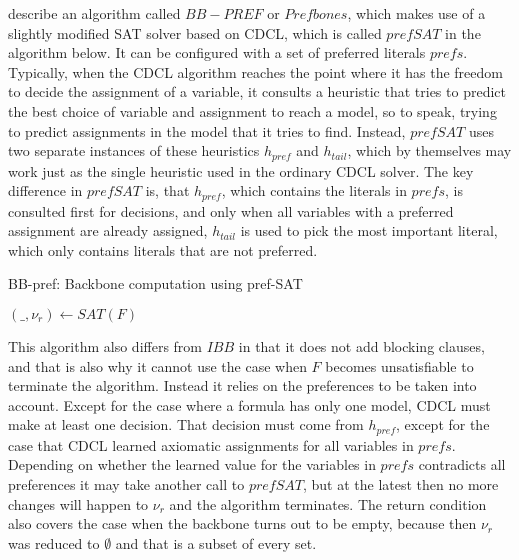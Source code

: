 \cite{PJ18} describe an algorithm called $BB-PREF$ or $Prefbones$, which makes use of a slightly modified SAT solver based on CDCL, which is called $prefSAT$ in the algorithm below. It can be configured with a set of preferred literals $prefs$. Typically, when the CDCL algorithm reaches the point where it has the freedom to decide the assignment of a variable, it consults a heuristic that tries to predict the best choice of variable and assignment to reach a model, so to speak, trying to predict assignments in the model that it tries to find. Instead, $prefSAT$ uses two separate instances of these heuristics $h_{pref}$ and $h_{tail}$, which by themselves may work just as the single heuristic used in the ordinary CDCL solver. The key difference in $prefSAT$ is, that $h_{pref}$, which contains the literals in $prefs$,  is consulted first for decisions, and only when all variables with a preferred assignment are already assigned, $h_{tail}$ is used to pick the most important literal, which only contains literals that are not preferred.


\begin{algorithm}
\caption{{\sc BB-pref: Backbone computation using pref-SAT}}
\DontPrintSemicolon
{}

$(\_,\nu_r) \gets SAT(F) $\;

\end{algorithm}

This algorithm also differs from $IBB$ in that it does not add blocking clauses, and that is also why it cannot use the case when $F$ becomes unsatisfiable to terminate the algorithm. Instead it relies on the preferences to be taken into account. Except for the case where a formula has only one model, CDCL must make at least one decision. That decision must come from $h_{pref}$, except for the case that CDCL learned axiomatic assignments for all variables in $prefs$. Depending on whether the learned value for the variables in $prefs$ contradicts all preferences it may take another call to $prefSAT$, but at the latest then no more changes will happen to $\nu_r$ and the algorithm terminates. The return condition also covers the case when the backbone turns out to be empty, because then $\nu_r$ was reduced to $\emptyset$ and that is a subset of every set.

